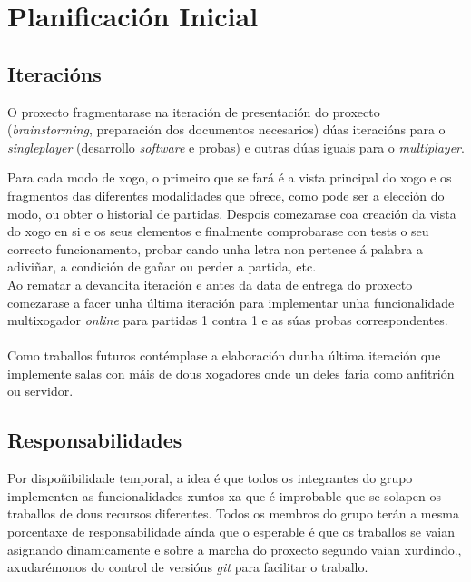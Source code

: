 \chapter{Planificación Inicial}
\label{chap:plan_inicial}

\section{Iteracións}
O proxecto fragmentarase na iteración de presentación do proxecto (\textit{brainstorming}, preparación dos documentos necesarios) dúas iteracións para o \textit{singleplayer} (desarrollo \textit{software} e probas) e outras dúas iguais para o \textit{multiplayer}.

Para cada modo de xogo, o primeiro que se fará é a vista principal do xogo e os fragmentos das diferentes modalidades que ofrece, como pode ser a elección do modo, ou obter o historial de partidas. Despois
comezarase coa creación da vista do xogo en si e os seus elementos e finalmente comprobarase con tests o seu correcto funcionamento, probar cando unha letra non pertence á palabra
a adiviñar, a condición de gañar ou perder a partida, etc.\\
Ao rematar a devandita iteración e antes da data de entrega do proxecto comezarase a  facer unha última iteración para implementar unha funcionalidade multixogador \textit{online} para partidas 1 contra 1 e as súas probas correspondentes. \\ \\
Como traballos futuros contémplase a elaboración dunha última iteración que implemente salas con máis de dous xogadores onde un deles faria como anfitrión ou servidor.

\section{Responsabilidades}
Por dispoñibilidade temporal, a idea é que todos os integrantes do grupo implementen as funcionalidades xuntos xa que é improbable que se solapen os traballos de dous recursos diferentes. Todos os membros do grupo terán a mesma porcentaxe de responsabilidade aínda que o esperable é que os traballos se vaian asignando dinamicamente e sobre a marcha do proxecto segundo vaian xurdindo., axudarémonos do control de versións \textit{git} para facilitar o traballo.

